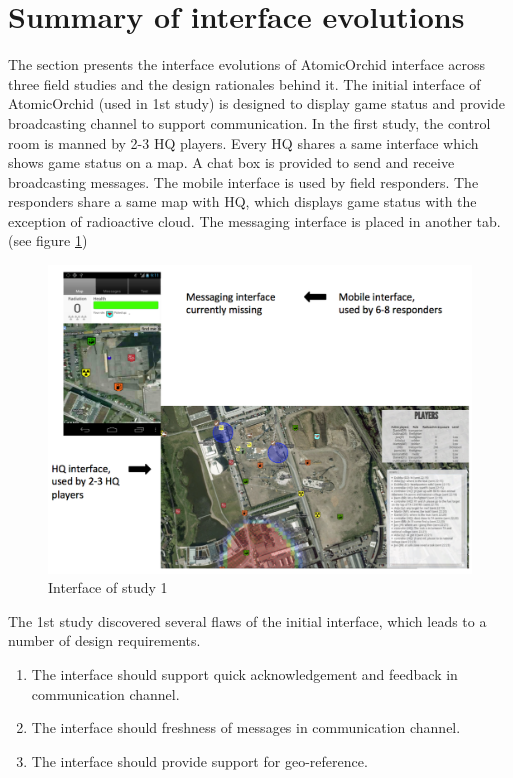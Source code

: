 \section{Summary of interface evolutions}\label{sec:conclusionIE}
The section presents the interface evolutions of AtomicOrchid interface across three field studies and the design rationales behind it. The initial interface of AtomicOrchid (used in 1st study) is designed to display game status and provide broadcasting channel to support communication. In the first study, the control room is manned by 2-3 HQ players. Every HQ shares a same interface which shows game status on a map. A chat box is provided to send and receive broadcasting messages. The mobile interface is used by field responders. The responders share a same map with HQ, which displays game status with the exception of radioactive cloud. The messaging interface is placed in another tab.(see figure \ref{fig:study1interface})\\ 



\begin{figure}[H]
  \centering
  \includegraphics[width=1\textwidth]{img/conclusion/study1interface}
  \caption{Interface of study 1}
  \label{fig:study1interface}
\end{figure}


The 1st study discovered several flaws of the initial interface, which leads to a number of design requirements. 

\begin{enumerate}
	 \item The interface should support quick acknowledgement and feedback in communication channel.
	 \item The interface should freshness of messages in communication channel.
	 \item The interface should provide support for geo-reference.
\end{enumerate}

